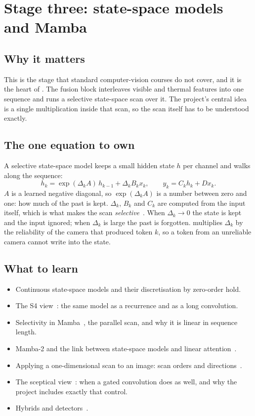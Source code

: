 \chapter{Stage three: state-space models and Mamba}

\section{Why it matters}

This is the stage that standard computer-vision courses do not cover, and it is the heart of \method{}. The
fusion block interleaves visible and thermal features into one sequence and runs a selective state-space scan
over it. The project's central idea is a single multiplication inside that scan, so the scan itself has to be
understood exactly.

\section{The one equation to own}

A selective state-space model keeps a small hidden state $h$ per channel and walks along the sequence:
\[
  h_k = \exp(\Delta_k A)\, h_{k-1} + \Delta_k B_k x_k, \qquad y_k = C_k h_k + D x_k .
\]
$A$ is a learned negative diagonal, so $\exp(\Delta_k A)$ is a number between zero and one: how much of the past
is kept. $\Delta_k$, $B_k$ and $C_k$ are computed from the input itself, which is what makes the scan
\emph{selective}~\cite{gu2023mamba}. When $\Delta_k \to 0$ the state is kept and the input ignored; when
$\Delta_k$ is large the past is forgotten. \method{} multiplies $\Delta_k$ by the reliability of the camera that
produced token $k$, so a token from an unreliable camera cannot write into the state.

\section{What to learn}

\begin{itemize}
  \item Continuous state-space models and their discretisation by zero-order hold.
  \item The S4 view~\cite{gu2022s4}: the same model as a recurrence and as a long convolution.
  \item Selectivity in Mamba~\cite{gu2023mamba}, the parallel scan, and why it is linear in sequence length.
  \item Mamba-2 and the link between state-space models and linear attention~\cite{dao2024mamba2}.
  \item Applying a one-dimensional scan to an image: scan orders and directions~\cite{zhu2024vim,liu2024vmamba}.
  \item The sceptical view~\cite{yu2025mambaout}: when a gated convolution does as well, and why the project
        includes exactly that control.
  \item Hybrids and detectors~\cite{hatamizadeh2025mambavision,wang2025mambayolo}.
\end{itemize}

